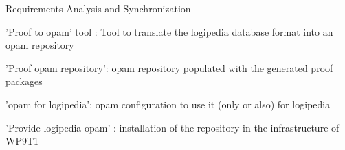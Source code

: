 \begin{workpackage}[id=access,wphases=0-48,type=MGT,
  short=Access,%
  title={Access to the infrastructure},
  lead=Inr,
  InrRM=28,
  OcaRM=6]
\begin{tasklist}
\end{tasklist}

\begin{wpdelivs}
  \begin{wpdeliv}[due=3,miles=startup,id=requirements,dissem=PU,nature=DEM,lead=Inr]
      {Requirements Analysis and Synchronization}
  \end{wpdeliv}
  \begin{wpdeliv}[due=2,miles=???,id=acessopamtool,dissem=PU,nature=DEM,lead=Oca]
      {'Proof to opam' tool : Tool to translate the logipedia database format into an opam repository}
  \end{wpdeliv}
  \begin{wpdeliv}[due=1,miles=???,id=acessopamrepo,dissem=PU,nature=DEM,lead=Oca]
      {'Proof opam repository': opam repository populated with the generated proof packages }
  \end{wpdeliv}
  \begin{wpdeliv}[due=1,miles=???,id=accessopamconfig,dissem=PU,nature=DEM,lead=OCa]
    {'opam for logipedia': opam configuration to use it (only or also) for logipedia}
  \end{wpdeliv}
  \begin{wpdeliv}[due=1,miles=???,id=accessopam,dissem=PU,nature=DEM,lead=Oca]
    {'Provide logipedia opam' : installation of the repository in the infrastructure of WP9T1 }
  \end{wpdeliv}
\end{wpdelivs}
\end{workpackage}


